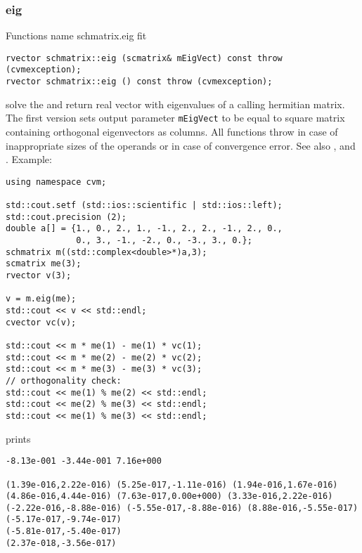 \subsubsection{eig}
Functions%
\pdfdest name {schmatrix.eig} fit
\begin{verbatim}
rvector schmatrix::eig (scmatrix& mEigVect) const throw (cvmexception);
rvector schmatrix::eig () const throw (cvmexception);
\end{verbatim}
solve the
and return  real vector with eigenvalues
of a calling hermitian matrix.
The first version
sets  output parameter \verb"mEigVect" to be equal
to  square matrix containing orthogonal
eigenvectors as columns.
All  functions
throw 
in case of inappropriate sizes of the operands
or in case of convergence error.
See also
,
 and
.
Example:
\begin{Verbatim}
using namespace cvm;

std::cout.setf (std::ios::scientific | std::ios::left); 
std::cout.precision (2);
double a[] = {1., 0., 2., 1., -1., 2., 2., -1., 2., 0.,
              0., 3., -1., -2., 0., -3., 3., 0.};
schmatrix m((std::complex<double>*)a,3);
scmatrix me(3);
rvector v(3);

v = m.eig(me);
std::cout << v << std::endl;
cvector vc(v);

std::cout << m * me(1) - me(1) * vc(1);
std::cout << m * me(2) - me(2) * vc(2);
std::cout << m * me(3) - me(3) * vc(3);
// orthogonality check:
std::cout << me(1) % me(2) << std::endl;
std::cout << me(2) % me(3) << std::endl;
std::cout << me(1) % me(3) << std::endl;
\end{Verbatim}
prints
\begin{Verbatim}
-8.13e-001 -3.44e-001 7.16e+000

(1.39e-016,2.22e-016) (5.25e-017,-1.11e-016) (1.94e-016,1.67e-016)
(4.86e-016,4.44e-016) (7.63e-017,0.00e+000) (3.33e-016,2.22e-016)
(-2.22e-016,-8.88e-016) (-5.55e-017,-8.88e-016) (8.88e-016,-5.55e-017)
(-5.17e-017,-9.74e-017)
(-5.81e-017,-5.40e-017)
(2.37e-018,-3.56e-017)
\end{Verbatim}
\newpage



